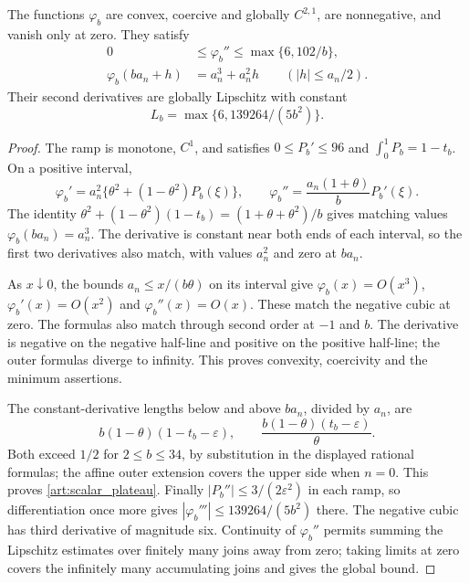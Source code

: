 \begin{lemma}\label{art:upper_scalar_lemma}
The functions $\varphi_b$ are convex, coercive and globally $C^{2,1}$,
are nonnegative, and vanish only at zero. They satisfy
\begin{align}
 0&\le\varphi_b''\le\max\{6,102/b\},\label{art:scalar_curvature}\\
 \varphi_b(ba_n+h)&=a_n^3+a_n^2h
       \qquad(|h|\le a_n/2).\label{art:scalar_plateau}
\end{align}
Their second derivatives are globally Lipschitz with constant
\[
 L_b=\max\{6,139264/(5b^2)\}.
\]
\end{lemma}
\begin{proof}
The ramp is monotone, $C^1$, and satisfies
$0\le P_b'\le96$ and $\int_0^1P_b=1-t_b$. On a positive interval,
\[
 \varphi_b'=a_n^2\{\theta^2+(1-\theta^2)P_b(\xi)\},\qquad
 \varphi_b''=\frac{a_n(1+\theta)}bP_b'(\xi).
\]
The identity
$\theta^2+(1-\theta^2)(1-t_b)=(1+\theta+\theta^2)/b$
gives matching values $\varphi_b(ba_n)=a_n^3$. The derivative is
constant near both ends of each interval, so the first two derivatives
also match, with values $a_n^2$ and zero at $ba_n$.

As $x\downarrow0$, the bounds $a_n\le x/(b\theta)$ on its interval
give $\varphi_b(x)=O(x^3)$, $\varphi_b'(x)=O(x^2)$ and
$\varphi_b''(x)=O(x)$. These match the negative cubic at zero.
The formulas also match through second order at $-1$ and $b$.
The derivative is negative on the negative half-line and positive on the
positive half-line; the outer formulas diverge to infinity. This proves
convexity, coercivity and the minimum assertions.

The constant-derivative lengths below and above $ba_n$, divided by $a_n$,
are
\[
 b(1-\theta)(1-t_b-\varepsilon),\qquad
 \frac{b(1-\theta)(t_b-\varepsilon)}\theta.
\]
Both exceed $1/2$ for $2\le b\le34$, by substitution in the displayed
rational formulas; the affine outer extension covers the upper side when
$n=0$. This proves \eqref{art:scalar_plateau}.
Finally $|P_b''|\le3/(2\varepsilon^2)$ in each ramp, so differentiation
once more gives $|\varphi_b'''|\le139264/(5b^2)$ there. The negative
cubic has third derivative of magnitude six. Continuity of
$\varphi_b''$ permits summing the Lipschitz estimates over finitely many
joins away from zero; taking limits at zero covers the infinitely many
accumulating joins and gives the global bound.
\end{proof}

